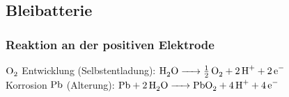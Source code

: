 \documentclass[english]{latex4ei/latex4ei_sheet}
\begin{document}
\begin{sectionbox}

	\subsection{Bleibatterie}
	
		\subsubsection{Reaktion an der positiven Elektrode}
		\begin{center}
		\end{center}
		$\ce{O2}$ Entwicklung (Selbstentladung): $\ce{H2O -> 1/2O2 + 2H+ +2e-}$\\
		Korrosion $\ce{Pb}$ (Alterung): $\ce{Pb + 2H2O -> PbO2 + 4H+ +4e-}$
\end{sectionbox}


\end{document}
